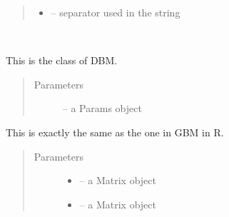 \documentclass[letterpaper,10pt,english]{sphinxmanual}
\begin{document}
\begin{fulllineitems}
\begin{fulllineitems}
\begin{quote}
\begin{description}
\begin{itemize}
\item {} 
 -- separator used in the string

\end{itemize}

\end{description}\end{quote}

\end{fulllineitems}


\end{fulllineitems}


\begin{fulllineitems}
\label{\detokenize{index:dbm_py.interface.DBM}}~

\begin{fulllineitems}
\label{\detokenize{index:dbm_py.interface.DBM.__init__}}
This is the class of DBM.
\begin{quote}\begin{description}
\item[{Parameters}] \leavevmode
{} -- a Params object

\end{description}\end{quote}

\end{fulllineitems}


\begin{fulllineitems}
\label{\detokenize{index:dbm_py.interface.DBM.calibrate_plot}}
This is exactly the same as the one in GBM in R.
\begin{quote}\begin{description}
\item[{Parameters}] \leavevmode\begin{itemize}
\item {} 
 -- a Matrix object

\item {} 
 -- a Matrix object


\end{itemize}
\end{description}
\end{quote}
\end{fulllineitems}
\end{fulllineitems}
\end{document}

